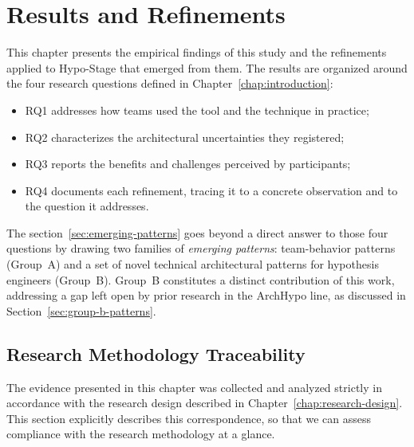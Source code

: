 \chapter{Results and Refinements}
\label{chap:results}
\label{ch:results}

This chapter presents the empirical findings of this study and the refinements applied to
Hypo-Stage that emerged from them. The results are organized around the four
research questions defined in Chapter~\ref{chap:introduction}: 
\begin{itemize}
  \item RQ1 addresses how teams used the tool and the technique in practice;
  \item RQ2 characterizes the architectural uncertainties they registered;
  \item RQ3 reports the benefits and challenges perceived by participants;
  \item RQ4 documents each refinement, tracing it to a concrete observation and to the question it addresses.
\end{itemize}

The section~\ref{sec:emerging-patterns} goes beyond a direct answer to those four
questions by drawing two families of \textit{emerging patterns}: team-behavior
patterns (Group~A) and a set of novel technical architectural patterns for
hypothesis engineers (Group~B). Group~B constitutes a distinct contribution
of this work, addressing a gap left open by prior research in the ArchHypo line,
as discussed in Section~\ref{sec:group-b-patterns}.

\section*{Research Methodology Traceability}

The evidence presented in this chapter was collected and analyzed strictly in
accordance with the research design described in Chapter~\ref{chap:research-design}.
This section explicitly describes this correspondence, so that we can assess
compliance with the research methodology at a glance.

